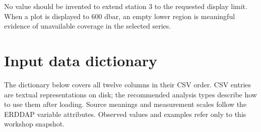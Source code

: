 \documentclass[11pt,letterpaper]{article}
\begin{document}
No value should be invented to extend station 3 to the requested display limit. When a plot is displayed to 600 dbar, an empty lower region is meaningful evidence of unavailable coverage in the selected series.

\section{Input data dictionary}
\label{sec:dictionary}

The dictionary below covers all twelve columns in their CSV order. CSV entries are textual representations on disk; the recommended analysis types describe how to use them after loading. Source meanings and measurement scales follow the ERDDAP variable attributes.\cite{erddap} Observed values and examples refer only to this workshop snapshot.
\end{document}
